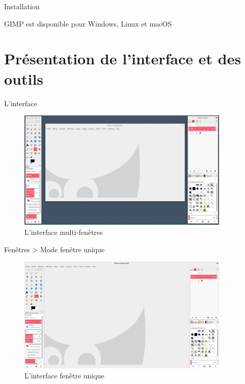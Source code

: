 \documentclass[10pt,svgnames,usenames,table]{beamer}
\begin{document}
\begin{frame}{Installation}
    \begin{center}
    GIMP est disponible pour Windows, Linux et macOS
    \vspace{1cm}\Large
    \end{center}
\end{frame}

\section{Présentation de l'interface et des outils}
\begin{frame}[allowframebreaks]{L'interface}
    \begin{figure}
        \centering
        \includegraphics[width=0.9\textwidth]{Images/gimp_multiple_windows}
        \caption{L'interface multi-fenêtres}
    \end{figure} 
    \framebreak
    \begin{center}
        Fenêtres > Mode fenêtre unique
        \begin{figure}
            \includegraphics[width=0.9\textwidth]{Images/gimp_single_window}
            \caption{L'interface fenêtre unique}
        \end{figure}
    \end{center}
\end{frame}
\end{document}
